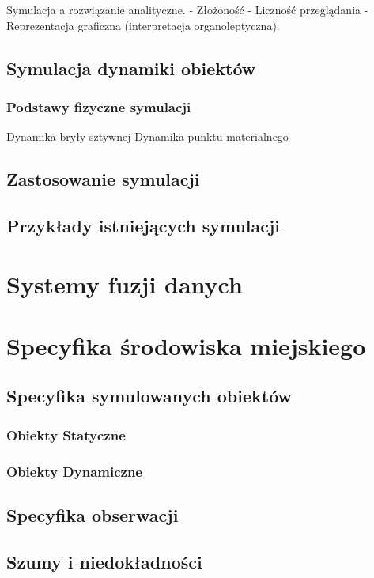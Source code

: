 Symulacja a rozwiązanie analityczne.
- Złożoność
- Liczność przeglądania
- Reprezentacja graficzna (interpretacja organoleptyczna).

\subsection{Symulacja dynamiki obiektów}
\subsubsection{Podstawy fizyczne symulacji}
Dynamika bryły sztywnej
Dynamika punktu materialnego
\subsection{Zastosowanie symulacji}
\subsection{Przykłady istniejących symulacji}
\section[Systemy fuzji danych][Systemy fuzji danych]{Systemy fuzji danych}
\section[Specyfika środowiska miejskiego][Specyfika środowiska miejskiego]{Specyfika środowiska miejskiego}
\subsection{Specyfika symulowanych obiektów}
\subsubsection{Obiekty Statyczne}
\subsubsection{Obiekty Dynamiczne}
\subsection{Specyfika obserwacji}
\subsection{Szumy i niedokładności}